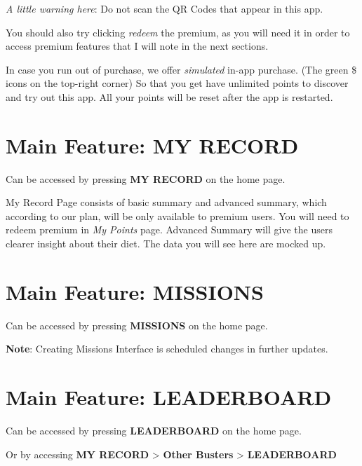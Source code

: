 \documentclass[a4paper,12pt]{article}
\begin{document}
\textit{A little warning here}: Do not scan the QR Codes that appear in this app.

You should also try clicking \textit{redeem} the premium, as you will need it
in order to access premium features that I will note in the next sections.

In case you run out of purchase, we offer \textit{simulated} in-app purchase.
(The green \$ icons on the top-right corner) So that you get have unlimited points
to discover and try out this app. All your points will be reset after the app is restarted.

\pagebreak
\section{Main Feature: MY RECORD}

Can be accessed by pressing \textbf{MY RECORD} on the home page.


My Record Page consists of basic summary and advanced summary, which according
to our plan, will be only available to premium users. You will need to
redeem premium in \textit{My Points} page.
Advanced Summary will give the users clearer insight about their diet.
The data you will see here are mocked up.

\pagebreak
\section{Main Feature: MISSIONS}

Can be accessed by pressing \textbf{MISSIONS} on the home page.


\textbf{Note}: Creating Missions Interface is scheduled changes in further updates.

\pagebreak
\section{Main Feature: LEADERBOARD}

Can be accessed by pressing \textbf{LEADERBOARD} on the home page.

\noindent
Or by accessing \textbf{MY RECORD} > \textbf{Other Busters} > \textbf{LEADERBOARD}

\end{document}
